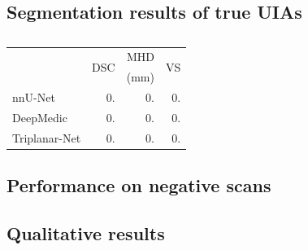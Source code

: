 \subsection{Segmentation results of true UIAs}

\begin{table}[h]
	\centering
	\begin{tabular}{ l  r r r }
%		
		& \multirow{2}{2em}{DSC} & MHD & \multirow{2}{2em}{VS} \\
		& & (mm) & \\
		\hline
		nnU-Net & 0. & 0. & 0. \\
		DeepMedic & 0. & 0. & 0. \\
		Triplanar-Net & 0. & 0. & 0. \\
	\end{tabular}
	\caption{}
	\label{table:metrics_pos}
\end{table}

\subsection{Performance on negative scans}


\subsection{Qualitative results}


